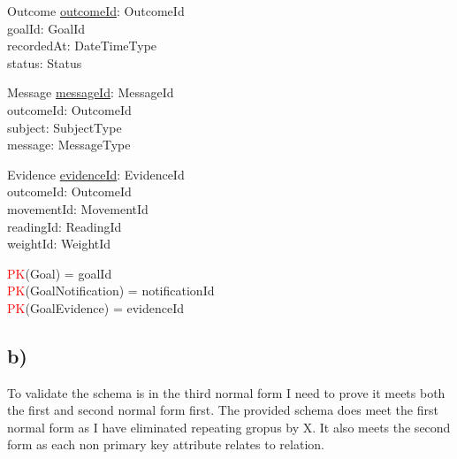 \documentclass{article}
\begin{document}
\begin{schema}{Outcome}
	\underline{outcomeId}: OutcomeId \\
    goalId: GoalId \\
    recordedAt: DateTimeType \\
    status: Status \\
\end{schema}

\begin{schema}{Message}
	\underline{messageId}: MessageId \\
    outcomeId: OutcomeId \\
    subject: SubjectType \\
    message: MessageType \\
\end{schema}

\begin{schema}{Evidence}
	\underline{evidenceId}: EvidenceId \\
    outcomeId: OutcomeId \\
    movementId: MovementId \\
    readingId: ReadingId \\ 
    weightId: WeightId \\
\end{schema}

\begin{zed}
\textcolor{red}{PK}(Goal) = { goalId }  \\
\textcolor{red}{PK}(GoalNotification) = { notificationId }  \\
\textcolor{red}{PK}(GoalEvidence) = { evidenceId }  \\
\end{zed}

\pagebreak 

\subsection*{\small b)}

To validate the schema is in the third normal form I need to prove it meets both the first and second normal form first.
\newline
\newline
The provided schema does meet the first normal form as I have eliminated repeating gropus by X.
\newline
\newline
It also meets the second form as each non primary key attribute relates to relation.
\end{document}
